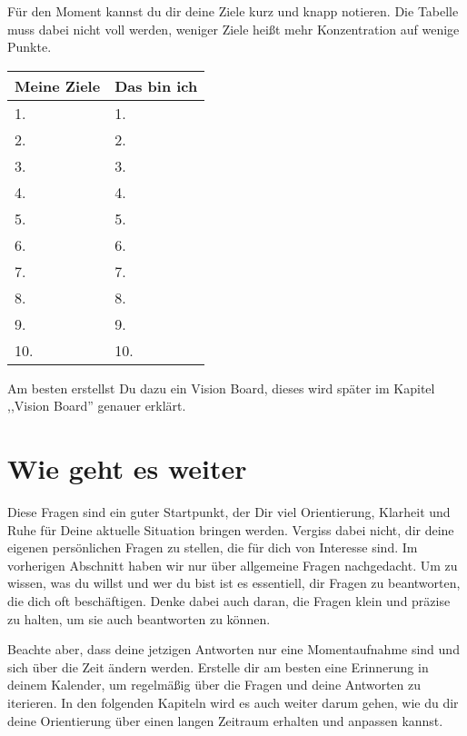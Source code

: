 \documentclass[../Lebensziel.tex]{subfiles}
\begin{document}
Für den Moment kannst du dir deine Ziele kurz und knapp notieren. Die Tabelle muss dabei nicht voll werden, weniger Ziele heißt mehr Konzentration auf wenige Punkte.

\begin{table}[h!]
    \centering
    \setlength{\tabcolsep}{18pt}
    \renewcommand{\arraystretch}{1.5}
    \begin{tabular}{p{5.5cm}|p{5.5cm}}
        \textbf{Meine Ziele} & \textbf{Das bin ich} \\\hline
        1.                   & 1.                   \\\hline
        2.                   & 2.                   \\\hline
        3.                   & 3.                   \\\hline
        4.                   & 4.                   \\\hline
        5.                   & 5.                   \\\hline
        6.                   & 6.                   \\\hline
        7.                   & 7.                   \\\hline
        8.                   & 8.                   \\\hline
        9.                   & 9.                   \\\hline
        10.                  & 10.
    \end{tabular}
    \label{kleines Lebensziel}
\end{table}

Am besten erstellst Du dazu ein Vision Board, dieses wird später im Kapitel ,,Vision Board'' genauer erklärt.

\section{Wie geht es weiter}
Diese Fragen sind ein guter Startpunkt, der Dir viel Orientierung, Klarheit und Ruhe für Deine aktuelle Situation bringen werden. Vergiss dabei nicht, dir deine eigenen persönlichen Fragen zu stellen, die für dich von Interesse sind. Im vorherigen Abschnitt haben wir nur über allgemeine Fragen nachgedacht. Um zu wissen, was du willst und wer du bist ist es essentiell, dir Fragen zu beantworten, die dich oft beschäftigen. Denke dabei auch daran, die Fragen klein und präzise zu halten, um sie auch beantworten zu können.

Beachte aber, dass deine jetzigen Antworten nur eine Momentaufnahme sind und sich über die Zeit ändern werden. Erstelle dir am besten eine Erinnerung in deinem Kalender, um regelmäßig über die Fragen und deine Antworten zu iterieren.
In den folgenden Kapiteln wird es auch weiter darum gehen, wie du dir deine Orientierung über einen langen Zeitraum erhalten und anpassen kannst.
\end{document}

